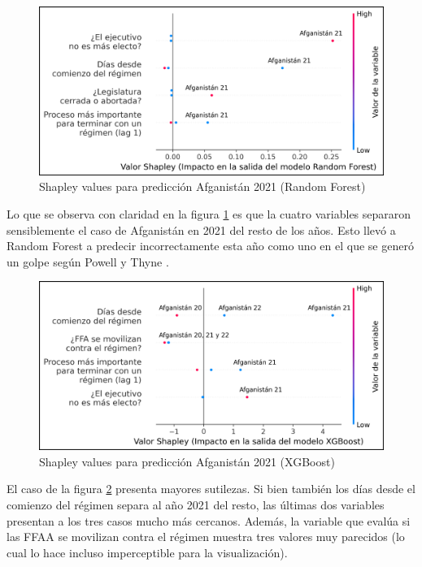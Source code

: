 \documentclass{article}
\begin{document}
\begin{figure}[H]
  \centering
  \includegraphics[width=.75\textwidth]{13_shapley_values_rf_afganistan.png}
  \caption{Shapley values para predicción Afganistán 2021 (Random Forest)\label{fig:shapley_rf_afganistan}}
\end{figure}

Lo que se observa con claridad en la figura \ref{fig:shapley_rf_afganistan} es que la cuatro variables
separaron sensiblemente el caso de Afganistán en 2021 del resto de los años. Esto llevó a Random Forest
a predecir incorrectamente esta año como uno en el que se generó un golpe según Powell y Thyne 
\citeyear{Pow11}.

\begin{figure}[H]
  \centering
  \includegraphics[width=.75\textwidth]{14_shapley_values_xgb_afganistan.png}
  \caption{Shapley values para predicción Afganistán 2021 (XGBoost)\label{fig:shapley_xgb_afganistan}}
\end{figure}

El caso de la figura \ref{fig:shapley_xgb_afganistan} presenta mayores sutilezas. Si bien también
los días desde el comienzo del régimen separa al año 2021 del resto, las últimas dos variables 
presentan a los tres casos mucho más cercanos. Además, la variable que evalúa si las FFAA se movilizan
contra el régimen muestra tres valores muy parecidos (lo cual lo hace incluso imperceptible para la
visualización).
\end{document}
